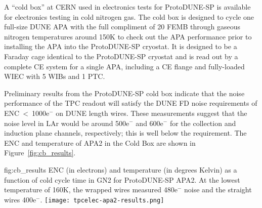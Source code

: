 A ``cold box'' at CERN used in electronics tests for ProtoDUNE-SP is available for electronics testing in cold nitrogen gas. The cold box is designed to cycle one full-size DUNE APA with the full compliment of 20 FEMB through gaseous nitrogen temperatures around 150K to check out the APA performance prior to installing the APA into the ProtoDUNE-SP cryostat. It is designed to be a Faraday cage identical to the ProtoDUNE-SP cryostat and is read out by a complete CE system for a single APA, including a CE flange and fully-loaded WIEC with 5 WIBs and 1 PTC.

Preliminary results from the ProtoDUNE-SP cold box indicate that
the noise performance of the TPC readout will satisfy the DUNE FD noise requirements of
ENC~<~1000e$^-$ on DUNE length wires. These measurements suggest that the noise level in
LAr would be around 500e$^-$ and 600e$^-$ for the collection and induction plane channels,
respectively; this is well below the requirement.  The ENC and temperature of APA2 in the
Cold Box are shown in Figure~\ref{fig:cb_results}.

\begin{dunefigure}
{fig:cb_results}
{ENC (in electrons) and temperature (in degrees Kelvin) as a function of cold cycle time in GN2 for ProtoDUNE-SP APA2. At the lowest temperature of 160K, the wrapped wires measured 480e$^-$ noise and the straight wires 400e$^-$.}
\texttt{[image: tpcelec-apa2-results.png]}
\end{dunefigure}
